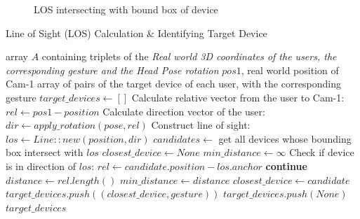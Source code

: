 \begin{figure}[H]
\begin{center}
	\end{center}
	\caption{LOS intersecting with bound box of device}
\end{figure}

\begin{algorithm}[H]
	\caption{Line of Sight (LOS) Calculation \& Identifying Target Device}
	\begin{algorithmic}[1]
		\Require array $A$ containing triplets of the \textit{Real world 3D coordinates of the users, the corresponding gesture and the Head Pose rotation}
		\Require $pos1$, real world position of Cam-1
		\Ensure array of pairs of the target device of each user, with the corresponding gesture
		\State $target\_devices \gets []$
		\State Calculate relative vector from the user to Cam-1: $rel \gets pos1 - position$
		\State Calculate direction vector of the user: $dir \gets apply\_rotation(pose, rel)$
		\State Construct line of sight: $los \gets Line::new(position, dir)$
		\State $candidates \gets$ get all devices whose bounding box intersect with $los$
		\State $closest\_device \gets None$
		\State $min\_distance \gets \infty$
		\State Check if device is in direction of $los$: $rel \gets candidate.position - los.anchor$
		\State \textbf{continue}
		\EndIf
		\State $distance \gets rel.length()$
		\State $min\_distance \gets distance$
		\State $closest\_device \gets candidate$
		\EndIf
		\EndFor
		\State $target\_devices.push((closest\_device, gesture))$
		\Else
		\State $target\_devices.push(None)$
		\EndIf
		\EndFor
		\State \Return $target\_devices$
	\end{algorithmic}
\end{algorithm}

